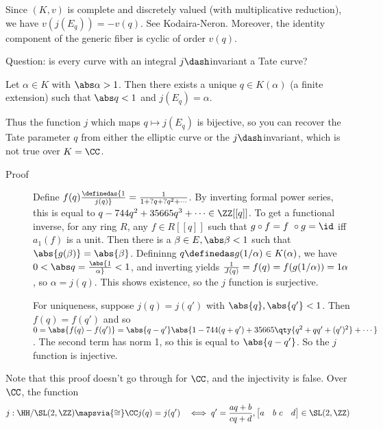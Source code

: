 Since \((K, v)\) is complete and discretely valued (with multiplicative
reduction), we have \(v(j(E_q)) = -v(q)\). See Kodaira-Neron. Moreover,
the identity component of the generic fiber is cyclic of order \(v(q)\).

Question: is every curve with an integral \(j\dash\)invariant a Tate
curve?

\begin{description}
\tightlist
\item[Lemma]
Let \(\alpha \in K\) with \(\abs \alpha > 1\). Then there exists a
unique \(q \in K(\alpha)\) (a finite extension) such that \(\abs q < 1\)
and \(j(E_q) = \alpha\).
\end{description}

Thus the function \(j\) which maps \(q \mapsto j(E_q)\) is bijective, so
you can recover the Tate parameter \(q\) from either the elliptic curve
or the \(j\dash\)invariant, which is not true over \(K = \CC\).

\begin{description}
\item[Proof]
Define
\(f(q) \definedas {1 \over j(q)} = {1 \over 1 + ?q + ? q^2 + \cdots}\).
By inverting formal power series, this is equal to
\(q - 744 q^2 + 35665 q^3 + \cdots \in \ZZ[[q]]\). To get a functional
inverse, for any ring \(R\), any \(f\in R[[q]]\) such that
\(g \circ f = f\ \circ g = \id\) iff \(a_1(f)\) is a unit. Then there is
a \(\beta \in E, \abs \beta < 1\) such that
\(\abs{g(\beta)} = \abs{\beta}\). Defininng
\(q \definedas g(1/\alpha) \in K(\alpha)\), we have
\(0 < \abs q = \abs{1 \over \alpha} < 1\), and inverting yields
\({1 \over J(q)} = f(q) = f(g(1/\alpha)) = 1\alpha\), so
\(\alpha = j(q)\). This shows existence, so the \(j\) function is
surjective.

\hfill\break

For uniqueness, suppose \(j(q) = j(q')\) with \(\abs{q}, \abs{q'} < 1\).
Then \(f(q) = f(q')\) and so
\(0 = \abs{f(q) - f(q')} = \abs{q-q'} \abs{1 - 744(q+q') + 35665 \qty{q^2 + qq' + (q')^2} + \cdots}\).
The second term has norm 1, so this is equal to \(\abs{q - q'}\). So the
\(j\) function is injective.
\end{description}

Note that this proof doesn't go through for \(\CC\), and the injectivity
is false. Over \(\CC\), the function \begin{align*}
j: \HH/ \SL(2, \ZZ) &\mapsvia{\cong} \CC
j(q) = j(q') &\iff q' = {aq + b \over cq + d},
\begin{bmatrix}
a & b \
c & d
\end{bmatrix}
\in \SL(2, \ZZ)
\end{align*}

